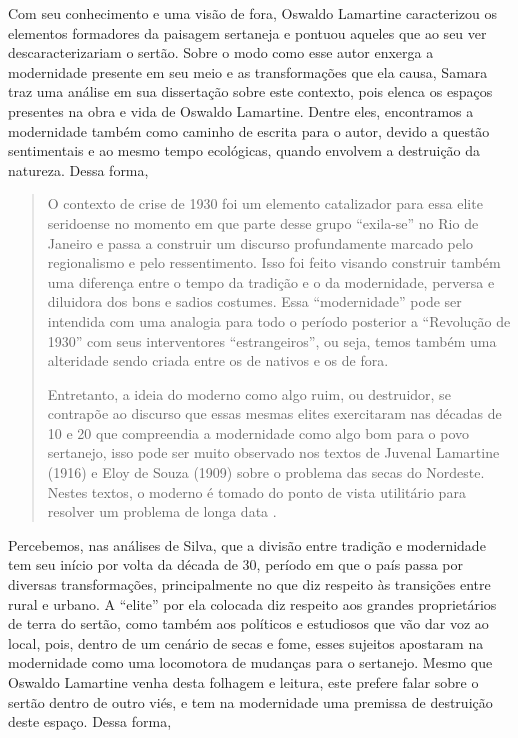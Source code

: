 \begin{refsection}
    Com seu conhecimento e uma visão de fora, Oswaldo Lamartine caracterizou os elementos formadores da paisagem sertaneja e pontuou aqueles que ao seu ver descaracterizariam o sertão. Sobre o modo como esse autor enxerga a modernidade presente em seu meio e as transformações que ela causa, Samara \textcite{SILVA2019Lugares} traz uma análise em sua dissertação sobre este contexto, pois elenca os espaços presentes na obra e vida de Oswaldo Lamartine. Dentre eles, encontramos a modernidade também como caminho de escrita para o autor, devido a questão sentimentais e ao mesmo tempo ecológicas, quando envolvem a destruição da natureza. Dessa forma, 

    \begin{quotation}
        O contexto de crise de 1930 foi um elemento catalizador para essa elite seridoense no momento em que parte desse grupo “exila-se” no Rio de Janeiro e passa a construir um discurso profundamente marcado pelo regionalismo e pelo ressentimento. Isso foi feito visando construir também uma diferença entre o tempo da tradição e o da modernidade, perversa e diluidora dos bons e sadios costumes. Essa “modernidade” pode ser intendida com uma analogia para todo o período posterior a “Revolução de 1930” com seus interventores “estrangeiros”, ou seja, temos também uma alteridade sendo criada entre os de nativos e os de fora. 
    
        Entretanto, a ideia do moderno como algo ruim, ou destruidor, se contrapõe ao discurso que essas mesmas elites exercitaram nas décadas de 10 e 20 que compreendia a modernidade como algo bom para o povo sertanejo, isso pode ser muito observado nos textos de Juvenal Lamartine (1916) e Eloy de Souza (1909) sobre o problema das secas do Nordeste. Nestes textos, o moderno é tomado do ponto de vista utilitário para resolver um problema de longa data \cite[p.~46--47]{SILVA2019Lugares}. 
    \end{quotation}

    Percebemos, nas análises de Silva, que a divisão entre tradição e modernidade tem seu início por volta da década de 30, período em que o país passa por diversas transformações, principalmente no que diz respeito às transições entre rural e urbano. A “elite” por ela colocada diz respeito aos grandes proprietários de terra do sertão, como também aos políticos e estudiosos que vão dar voz ao local, pois, dentro de um cenário de secas e fome, esses sujeitos apostaram na modernidade como uma locomotora de mudanças para o sertanejo. Mesmo que Oswaldo Lamartine venha desta folhagem e leitura, este prefere falar sobre o sertão dentro de outro viés, e tem na modernidade uma premissa de destruição deste espaço. Dessa forma, 


\end{refsection}
